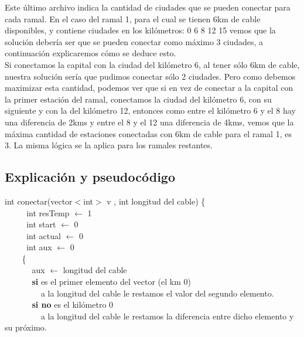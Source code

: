 Este último archivo indica la cantidad de ciudades que se pueden conectar para cada ramal. En el caso del ramal 1, para el cual se tienen 6km de cable disponibles, y contiene ciudades en los kilómetros: 0 6 8 12 15 vemos que la solución debería ser que se pueden conectar como máximo 3 ciudades, a continuación explicaremos cómo se deduce esto.\\

Si conectamos la capital con la ciudad del kilómetro 6, al tener sólo 6km de cable, nuestra solución sería que pudimos conectar sólo 2 ciudades. Pero como debemos maximizar esta cantidad, podemos ver que si en vez de conectar a la capital con la primer estación del ramal, conectamos la ciudad del kilómetro 6, con su siguiente y con la del kilómetro 12, entonces como entre el kilómetro 6 y el 8 hay una diferencia de 2kms y entre el 8 y el 12 una diferencia de 4kms, vemos que la máxima cantidad de estaciones conectadas con 6km de cable para el ramal 1, es 3. La misma lógica se la aplica para los ramales restantes.\\


\subsection{Explicación y pseudocódigo}

int conectar(vector$<$int$>$ v , int longitud del cable) \{ \\
$~~~~~~~~~~~~$int resTemp $\leftarrow$ 1 \\
$~~~~~~~~~~~~$int start $\leftarrow$ 0 \\
$~~~~~~~~~~~~$int actual $\leftarrow$ 0 \\
$~~~~~~~~~~~~$int aux $\leftarrow$ 0 \\

$~~~~~~~~$ \{  \\
$~~~~~~~~~~~~~~~$aux  $\leftarrow$ longitud del cable \\
$~~~~~~~~~~~~~~~$\textbf{si} es el primer elemento del vector (el km 0) \\
$~~~~~~~~~~~~~~~~~~~~$a la longitud del cable le restamos el valor del segundo elemento. \\
$~~~~~~~~~~~~~~~$\textbf{si no} es el kilómetro 0\\
$~~~~~~~~~~~~~~~~~~~~$a la longitud del cable le restamos la diferencia entre dicho elemento y su próximo.\\

